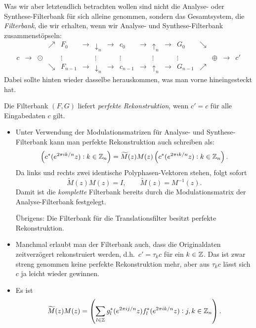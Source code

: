 Was wir aber letztendlich betrachten wollen sind nicht die Analyse- oder Synthese-Filterbank für 
sich alleine genommen, sondern das Gesamtsystem, die \emph{Filterbank}, die wir erhalten, wenn wir
Analyse- und Synthese-Filterbank zusammenstöpseln:
\[
  \begin{array}{*{17}{c}}
    & & & \nearrow & \boxed{F_{0}} & \rightarrow & \boxed{\downarrow_{n}} & \rightarrow & c_{0} 
        & \rightarrow & \boxed{\uparrow_{n}} & \rightarrow & \boxed{G_{0}} & \searrow & & \\
    c & \rightarrow & \odot & & \vdots & & \vdots & & \vdots 
        & & \vdots & & \vdots & & \oplus & \rightarrow & c' \\
    & & & \searrow & \boxed{F_{n-1}} & \rightarrow & \boxed{\downarrow_{n}} & \rightarrow & c_{n-1}
        & \rightarrow & \boxed{\uparrow_{n}} & \rightarrow & \boxed{G_{n-1}} & \nearrow & &
  \end{array}
\]
Dabei sollte hinten wieder dasselbe herauskommen, was man vorne hineingesteckt hat.

\begin{definition}
Die Filterbank $ (F,G) $ liefert \emph{perfekte Rekonstruktion}, wenn $ c' = c $ für alle
Eingabedaten $ c $ gilt.
\end{definition}

\begin{remark}\leavevmode
\begin{itemize}
\item Unter Verwendung der Modulationsmatrizen für Analyse- und Synthese-Filterbank kann man
  perfekte Rekonstruktion auch schreiben als:
  \[
      \left( c^{*}(e^{2\pi ik/n}z) : k \in \mathbb{Z}_{n} \right)
    = \widetilde{M}(z) M(z)
      \left( c^{*}(e^{2\pi ik/n}z) : k \in \mathbb{Z}_{n} \right).
  \]
  Da links und rechts zwei identische Polyphasen-Vektoren stehen, folgt sofort
  \[
    \widetilde{M}(z) M(z) = I, \qquad \widetilde{M}(z) = M^{-1}(z).
  \]
  Damit ist die \emph{komplette} Filterbank bereits durch die Modulationsmatrix der
  Analyse-Filterbank festgelegt.
  
  Übrigens: Die Filterbank für die Translationsfilter besitzt perfekte Rekonstruktion.
\item Manchmal erlaubt man der Filterbank auch, dass die Originaldaten zeitverzögert rekonstruiert
  werden, d.h.\ $ c' = \tau_{k} c $ für ein $ k \in \mathbb{Z} $. Das ist zwar streng genommen keine
  perfekte Rekonstruktion mehr, aber aus $ \tau_{k} c $ lässt sich $ c $ ja leicht wieder gewinnen.
\item Es ist
  \[
    \widetilde{M}(z) M(z) =
    \left( 
      \sum_{l \in \mathbb{Z}} g_{l}^{*}(e^{2\pi ij/n}z) f_{l}^{*}(e^{2\pi ik/n}z) : j,k \in \mathbb{Z}_{n}
    \right).
  \]
\end{itemize}
\end{remark}

